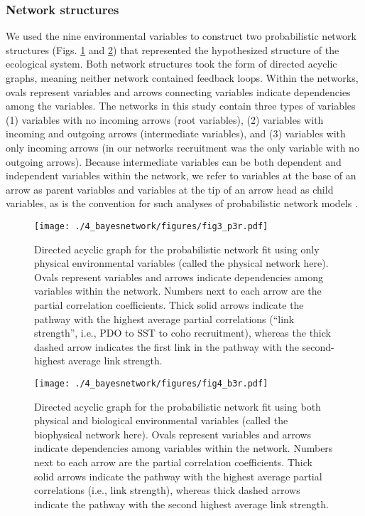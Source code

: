 \subsubsection{Network structures}

We used the nine environmental variables to construct two probabilistic network
structures (Figs. \ref{fig:bn:4} and \ref{fig:bn:5}) that represented the
hypothesized structure of the ecological system. Both network structures took
the form of directed acyclic graphs, meaning neither network contained feedback
loops. Within the networks, ovals represent variables and arrows connecting
variables indicate dependencies among the variables.  The networks in this study
contain three types of variables (1) variables with no incoming arrows (root
variables), (2) variables with incoming and outgoing arrows (intermediate
variables), and (3) variables with only incoming arrows (in our networks
recruitment was the only variable with no outgoing arrows). Because intermediate
variables can be both dependent and independent variables within the network, we
refer to variables at the base of an arrow as parent variables and variables at
the tip of an arrow head as child variables, as is the convention for such
analyses of probabilistic network models \citep{Koller2009a, Korb2004a}.

\begin{figure}[htbp]
  \centering \texttt{[image: ./4\_bayesnetwork/figures/fig3\_p3r.pdf]}
  \caption[Directed acyclic graph for the probabilistic network fit using only
           physical environmental variables]{Directed acyclic graph for the
           probabilistic network fit using only physical environmental variables
           (called the physical network here). Ovals represent variables and
           arrows indicate dependencies among variables within the network.
           Numbers next to each arrow are the partial correlation coefficients.
           Thick solid arrows indicate the pathway with the highest average
           partial correlations (``link strength'', i.e., PDO to SST to coho
           recruitment), whereas the thick dashed arrow indicates the first link
           in the pathway with the second-highest average link strength.}
  \label{fig:bn:4}
\end{figure}

\begin{figure}[htbp]
  \centering \texttt{[image: ./4\_bayesnetwork/figures/fig4\_b3r.pdf]}
  \caption[Directed acyclic graph for the probabilistic network fit using both
           physical and biological environmental variables]{Directed acyclic
           graph for the probabilistic network fit using both physical and
           biological environmental variables (called the biophysical network
           here). Ovals represent variables and arrows indicate dependencies
           among variables within the network. Numbers next to each arrow are
           the partial correlation coefficients. Thick solid arrows indicate the
           pathway with the highest average partial correlations (i.e., link
           strength), whereas thick dashed arrows indicate the pathway with the
           second highest average link strength.}
  \label{fig:bn:5}
\end{figure}

